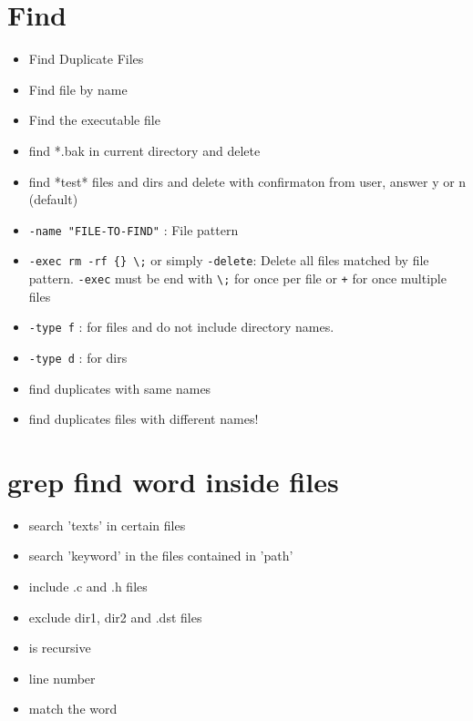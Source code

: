 \section{Find}
\begin{itemize}
\item{} Find Duplicate Files
\item{} Find file by name
\item{} Find the executable file
\item{} find *.bak in current directory and delete
\item{} find *test* files and dirs and delete with confirmaton from user, answer y or n (default)
\item \verb|-name "FILE-TO-FIND"| : File pattern
\item \verb|-exec rm -rf {} \;| or simply \verb|-delete|: Delete all files matched by file pattern. \verb|-exec| must be end with \verb|\;| for once per file or \verb|+| for once multiple files
\item \verb|-type f| : for files and do not include directory names.
\item \verb|-type d| : for dirs
\item{} find duplicates with same names
\item{} find duplicates files with different names!
\end{itemize}


\section{grep find word inside files}
\begin{itemize}
\item{} search 'texts' in certain files
\item{} search 'keyword' in the files contained in 'path'
\item{} include .c and .h files
\item{}
exclude dir1, dir2 and .dst files
\item {} is recursive
\item {} line number
\item {} match the word
\end{itemize}

